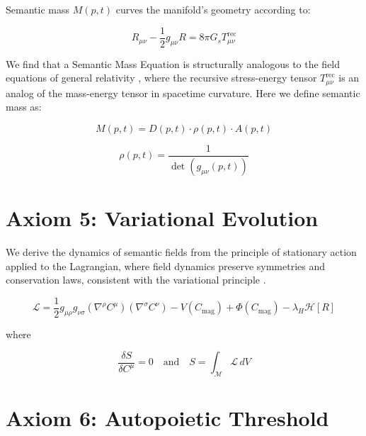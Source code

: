 Semantic mass \(M(p,t)\) curves the manifold's geometry according to:

\begin{equation}
R_{\mu\nu} - \frac{1}{2}g_{\mu\nu}R = 8\pi G_s T^{\text{rec}}_{\mu\nu}
\end{equation}

We find that a Semantic Mass Equation is structurally analogous to the field equations of general relativity \autocite{Einstein1915, MisnerThorneWheeler1973, Wald1984}, where the recursive stress-energy tensor \(T^{\text{rec}}_{\mu\nu}\) is an analog of the mass-energy tensor in spacetime curvature. Here we define semantic mass as:

\begin{equation}
M(p,t) = D(p,t) \cdot \rho(p,t) \cdot A(p,t)
\end{equation}

\begin{equation}
\rho(p,t) = \frac{1}{\det(g_{\mu\nu}(p,t))}
\end{equation}


\section{Axiom 5: Variational Evolution}
\label{1.5:axiom_5_variational_evolution}

We derive the dynamics of semantic fields from the principle of stationary action applied to the Lagrangian, where field dynamics preserve symmetries and conservation laws, consistent with the variational principle \autocite{GoldsteinPooleSafko2002, Arnold1989}.

\begin{equation}
\mathcal{L} = \frac{1}{2} g_{\mu\rho} g_{\nu\sigma} (\nabla^\rho C^\mu)(\nabla^\sigma C^\nu) - V(C_{\text{mag}}) + \Phi(C_{\text{mag}}) - \lambda_H \mathcal{H}[R]
\end{equation}

where

\begin{equation}
\frac{\delta S}{\delta C^\mu} = 0 \quad \text{and} \quad S = \int_{\mathcal{M}} \mathcal{L} \, dV
\end{equation}


\section{Axiom 6: Autopoietic Threshold}
\label{1.6:axiom_6_autopoietic_threshold}

